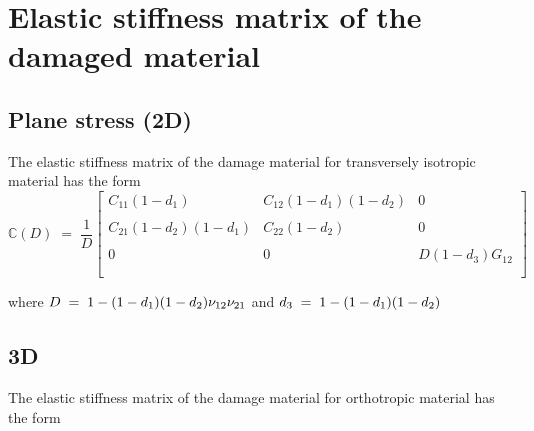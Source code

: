 \documentclass[12pt,a4paper,twoside,openright]{report}
\newcounter{savepage}
\begin{document}
\renewcommand{\thesection}{\Alph{section}.\arabic{section}}
\setcounter{page}{\thesavepage}
\section{Elastic stiffness matrix of the damaged material}
\subsection{Plane stress (2D)}
\indent\indent\indent The elastic stiffness matrix of the damage material for transversely isotropic material has the form \\

\begin{equation*}
\mathbb{C}(D) \; = \; \frac{1}{D}
 \begin{bmatrix}
  C_{11}(1 - d_{1}) & C_{12}(1 - d_{1})(1 - d_{2})  & 0 \\
  \\
  C_{21}(1 - d_{2})(1 - d_{1}) & C_{22}(1 - d_{2}) & 0 \\
 \\  
  0 & 0 &  D(1 - d_{3})G_{12} \\
  \\
 \end{bmatrix}
\end{equation*}

where $\mathlarger{D \; = \; 1 - (1 - d_{1})(1 - d_{2}) \nu_{12}\nu_{21}}$ and $\mathlarger{d_{3} \; = \; 1 - (1 - d_{1})(1 - d_{2}) }$



\subsection{3D}
\indent\indent\indent The elastic stiffness matrix of the damage material for orthotropic material has the form \\
\end{document}
